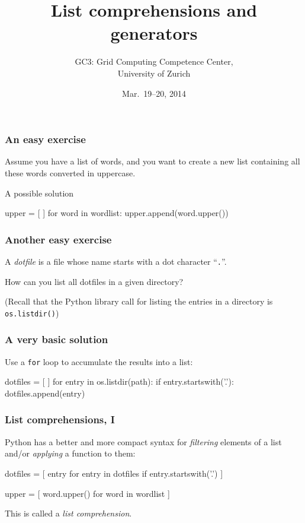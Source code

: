 \documentclass[english,serif,mathserif,xcolor=pdftex,dvipsnames,table]{beamer}
\title[Part 7]{%
  List comprehensions and generators
}
\author[GC3]{%
  GC3: Grid Computing Competence Center, \\
  University of Zurich
}
\date{Mar.~19--20, 2014}
\begin{document}
\maketitle

\begin{frame}[fragile]
  \frametitle{An easy exercise}
  Assume you have a list of words, and you want to create a new list
  containing all these words converted in uppercase.

\pause
\+
A possible solution
\begin{python}
upper = [ ]
for word in wordlist:
  upper.append(word.upper())
\end{python}
\end{frame}


\begin{frame}
  \frametitle{Another easy exercise}
  A \emph{dotfile} is a file whose name starts with a dot character
  ``\texttt{.}''.

  \+
  How can you list all dotfiles in a given directory?

  \+
  (Recall that the Python library call for listing the entries in a
  directory is \texttt{os.listdir()})
\end{frame}


\begin{frame}[fragile]
  \frametitle{A very basic solution}
  Use a \lstinline|for| loop to accumulate the results into a list:
  \begin{python}
dotfiles = [ ]
for entry in os.listdir(path):
  if entry.startswith('.'):
    dotfiles.append(entry)
  \end{python}
\end{frame}


\begin{frame}[fragile]
  \frametitle{List comprehensions, I}
  Python has a better and more compact syntax for \emph{filtering} elements
  of a list and/or \emph{applying} a function to them:
  \begin{python}
dotfiles = [ entry for entry in dotfiles
             if entry.startswith('.') ]
  \end{python}
\+
\begin{python}
upper = [ word.upper() for word in wordlist ]
\end{python}

  \+
  This is called a \emph{list comprehension}.
\end{frame}
\end{document}
